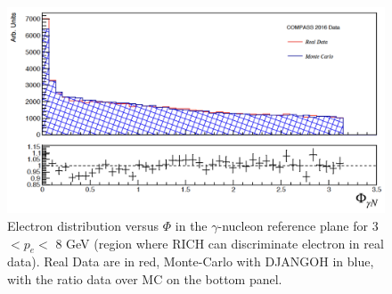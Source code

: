 \begin{figure}[!h]
  \centering
	\includegraphics[scale=0.6]{./gfx/Eprod2016.png}
	\caption{Electron distribution versus $\Phi$ in the $\gamma$-nucleon reference plane for 3 $< p_e <$ 8 GeV (region where RICH can discriminate electron in real data). Real Data are in red, Monte-Carlo with DJANGOH in blue, with the ratio data over MC on the bottom panel.}
	\label{pic:Eprod2016}
\end{figure}
